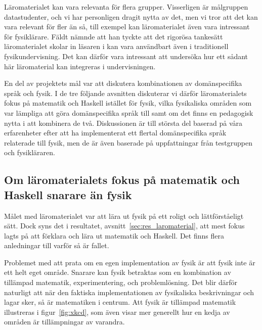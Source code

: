 Läromaterialet kan vara relevanta för flera grupper. Visserligen är målgruppen datastudenter, och vi har personligen dragit nytta av det,
men vi tror att det kan vara relevant för fler än så, till exempel kan läromaterialet även vara intressant för fysiklärare. Fäldt nämnde att han
tyckte att det rigorösa tankesätt läromaterialet skolar in läsaren i kan vara
användbart även i traditionell fysikundervisning. Det kan därför vara intressant att undersöka hur ett sådant här läromaterial kan
integreras i undervisningen.

En del av projektets mål var att diskutera kombinationen av
domänspecifika språk och fysik. I de tre följande avsnitten diskuterar vi därför
läromaterialets fokus på matematik och Haskell istället för fysik, vilka
fysikaliska områden som var lämpliga att göra domänspecifika språk till samt om
det finns en pedagogisk nytta i att kombinera de två. Diskussionen är till
största del baserad på våra erfarenheter efter att ha implementerat ett flertal
domänspecifika språk relaterade till fysik, men de är även baserade på
uppfattningar från testgruppen och fysikläraren.


\subsection{Om läromaterialets fokus på matematik och Haskell snarare än
fysik}\label{sec:fpf}

Målet med läromaterialet var att lära ut fysik på ett roligt och
lättförståeligt sätt. Dock syns det i resultatet,
avsnitt~\ref{sec:res_laromaterial}, att mest fokus lagts på att
förklara och lära ut matematik och Haskell. Det finns
flera anledningar till varför så är fallet.

Problemet med att prata om en egen implementation av fysik är att
fysik inte är ett helt eget område. Snarare kan fysik betraktas som en
kombination av tillämpad matematik, experimentering, och
problemlösning. Det blir därför naturligt att när den faktiska
implementationen av fysikaliska beskrivningar och lagar sker, så är
matematiken i centrum. Att fysik är tillämpad matematik illustreras i
figur~\ref{fig:xkcd}, som även visar mer generellt hur en kedja av
områden är tillämpningar av varandra.

